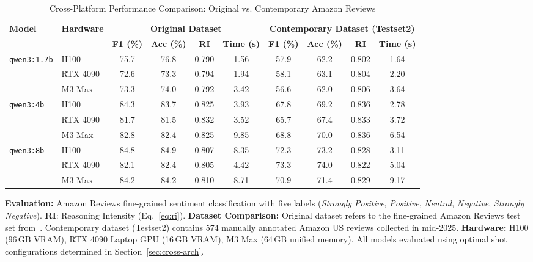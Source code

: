 \documentclass[conference]{IEEEtran}
\begin{document}
\begin{table}[htbp]
\caption{Cross-Platform Performance Comparison: Original vs. Contemporary Amazon Reviews}
\centering
\begin{tabular}{llcccccccc}
\toprule
\multirow{2}{*}{\textbf{Model}} & \multirow{2}{*}{\textbf{Hardware}} 
& \multicolumn{4}{c}{\textbf{Original Dataset}} 
& \multicolumn{4}{c}{\textbf{Contemporary Dataset (Testset2)}} \\
\cmidrule(lr){3-6} \cmidrule(lr){7-10}
& & \textbf{F1 (\%)} & \textbf{Acc (\%)} & \textbf{RI} & \textbf{Time (s)} 
  & \textbf{F1 (\%)} & \textbf{Acc (\%)} & \textbf{RI} & \textbf{Time (s)} \\
\midrule
\multirow{3}{*}{\texttt{qwen3:1.7b}} 
 & H100     & 75.7 & 76.8 & 0.790 & 1.56 & 57.9 & 62.2 & 0.802 & 1.64 \\
 & RTX 4090  & 72.6 & 73.3 & 0.794 & 1.94 & 58.1 & 63.1 & 0.804 & 2.20 \\
 & M3 Max   & 73.3 & 74.0 & 0.792 & 3.42 & 56.6 & 62.0 & 0.806 & 3.64 \\
\midrule
\multirow{3}{*}{\texttt{qwen3:4b}} 
 & H100     & 84.3 & 83.7 & 0.825 & 3.93 & 67.8 & 69.2 & 0.836 & 2.78 \\
 & RTX 4090  & 81.7 & 81.5 & 0.832 & 3.52 & 65.7 & 67.4 & 0.833 & 3.72 \\
 & M3 Max   & 82.8 & 82.4 & 0.825 & 9.85 & 68.8 & 70.0 & 0.836 & 6.54 \\
\midrule
\multirow{3}{*}{\texttt{qwen3:8b}} 
 & H100     & 84.8 & 84.9 & 0.807 & 8.35 & 72.3 & 73.2 & 0.828 & 3.11 \\
 & RTX 4090  & 82.1 & 82.4 & 0.805 & 4.42 & 73.3 & 74.0 & 0.822 & 5.04 \\
 & M3 Max   & 84.2 & 84.2 & 0.810 & 8.71 & 70.9 & 71.4 & 0.829 & 9.17 \\
\bottomrule
\end{tabular}
\label{tab:cross_platform_reasoning_results}

\vspace{2mm}
\textbf{Evaluation:} Amazon Reviews fine-grained sentiment classification with five labels 
(\textit{Strongly Positive}, \textit{Positive}, \textit{Neutral}, \textit{Negative}, \textit{Strongly Negative}). 
\textbf{RI}: Reasoning Intensity (Eq.~\ref{eq:ri}).
\textbf{Dataset Comparison:} Original dataset refers to the fine-grained Amazon Reviews test set from~\cite{huang2025explainable}. Contemporary dataset (Testset2) contains 574 manually annotated Amazon US reviews collected in mid-2025.\;
\textbf{Hardware:} H100 (96\,GB VRAM), RTX 4090 Laptop GPU (16\,GB VRAM), M3 Max (64\,GB unified memory). All models evaluated using optimal shot configurations determined in Section~\ref{sec:cross-arch}.
\end{table}
\end{document}
